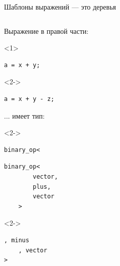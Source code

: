 \documentclass[@BEAMER_OPTIONS@]{beamer}
\begin{document}
\begin{frame}[fragile]{Шаблоны выражений --- это деревья}
    \begin{columns}
        \begin{column}{0.45\textwidth}
            \begin{exampleblock}{Выражение в правой части:}
                \begin{onlyenv}<1>
                    \begin{lstlisting}
a = x + y;
                    \end{lstlisting}
                \end{onlyenv}
                \begin{onlyenv}<2->
                    \begin{lstlisting}
a = x + y - z;
                    \end{lstlisting}
                \end{onlyenv}
            \end{exampleblock}
            \begin{exampleblock}{... имеет тип:}
                \begin{uncoverenv}<2->
                    \begin{lstlisting}[numbers=none]
binary_op<
                    \end{lstlisting}
                \end{uncoverenv}
                \begin{lstlisting}[numbers=none]
    binary_op<
        vector,
        plus,
        vector
    >
                \end{lstlisting}
                \begin{uncoverenv}<2->
                    \begin{lstlisting}[numbers=none]
    , minus
    , vector
>
                    \end{lstlisting}
                \end{uncoverenv}
            \end{exampleblock}
        \end{column}
        \begin{column}{0.45\textwidth}
            \begin{figure}
\end{figure}
\end{column}
\end{columns}
\end{frame}
\end{document}
